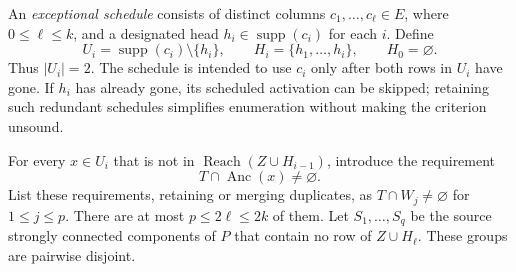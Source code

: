 An \emph{exceptional schedule} consists of distinct columns
$c_1,\ldots,c_\ell\in E$, where $0\leq\ell\leq k$, and a designated
head $h_i\in\operatorname{supp}(c_i)$ for each $i$.  Define
\[
       U_i=\operatorname{supp}(c_i)\setminus\{h_i\},\qquad
       H_i=\{h_1,\ldots,h_i\},\qquad H_0=\varnothing.
\]
Thus $|U_i|=2$.  The schedule is intended to use $c_i$ only after both rows
in $U_i$ have gone.  If $h_i$ has already gone, its scheduled activation
can be skipped; retaining such redundant schedules simplifies enumeration
without making the criterion unsound.

For every $x\in U_i$ that is not in
$\operatorname{Reach}(Z\cup H_{i-1})$, introduce the requirement
\begin{equation}\label{eq:triple-prerequisite}
                  T\cap\operatorname{Anc}(x)\ne\varnothing.
\end{equation}
List these requirements, retaining or merging duplicates, as
$T\cap W_j\ne\varnothing$ for $1\leq j\leq p$.  There are at most
$p\leq2\ell\leq2k$ of them.  Let $S_1,\ldots,S_q$ be the source strongly
connected components of $P$ that contain no row of $Z\cup H_\ell$.
These groups are pairwise disjoint.

